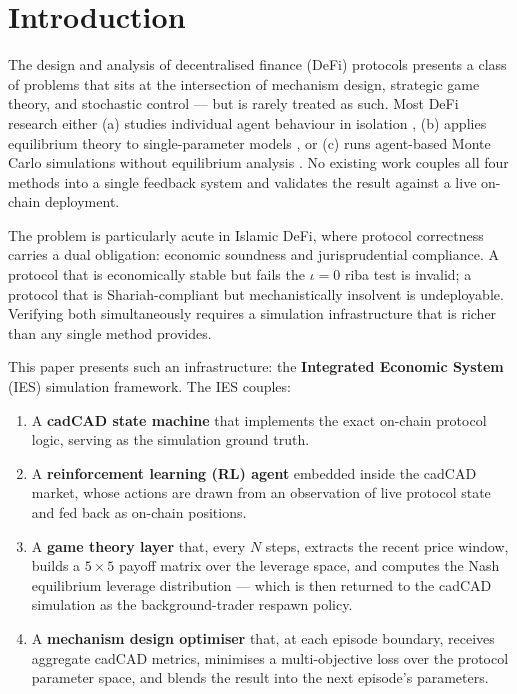 \documentclass[10pt,twocolumn]{article}
\theoremstyle{plain}
\theoremstyle{definition}
\begin{document}
\section*{}
\vspace{-1.5em}

\section{Introduction}
\label{sec:intro}

The design and analysis of decentralised finance (DeFi)
protocols presents a class of problems that sits at the
intersection of mechanism design, strategic game theory, and
stochastic control --- but is rarely treated as such.  Most
DeFi research either (a) studies individual agent behaviour
in isolation \cite{Daian2020,Qin2021}, (b) applies equilibrium
theory to single-parameter models \cite{Lehar2021}, or
(c) runs agent-based Monte Carlo simulations without
equilibrium analysis \cite{Angeris2020}.  No existing work
couples all four methods into a single feedback system and
validates the result against a live on-chain deployment.

The problem is particularly acute in Islamic DeFi, where
protocol correctness carries a dual obligation: economic
soundness and jurisprudential compliance.  A protocol that
is economically stable but fails the $\iota=0$ riba test is
invalid; a protocol that is Shariah-compliant but
mechanistically insolvent is undeployable.  Verifying both
simultaneously requires a simulation infrastructure that is
richer than any single method provides.

This paper presents such an infrastructure: the \textbf{Integrated
Economic System} (IES) simulation framework.  The IES
couples:

\begin{enumerate}[leftmargin=*,noitemsep]
\item A \textbf{cadCAD state machine} that implements the
  exact on-chain protocol logic, serving as the simulation
  ground truth.
\item A \textbf{reinforcement learning (RL) agent} embedded
  inside the cadCAD market, whose actions are drawn from
  an observation of live protocol state and fed back as
  on-chain positions.
\item A \textbf{game theory layer} that, every $N$ steps,
  extracts the recent price window, builds a
  $5\times5$ payoff matrix over the leverage space, and
  computes the Nash equilibrium leverage distribution ---
  which is then returned to the cadCAD simulation as the
  background-trader respawn policy.
\item A \textbf{mechanism design optimiser} that, at each
  episode boundary, receives aggregate cadCAD metrics,
  minimises a multi-objective loss over the protocol
  parameter space, and blends the result into the
  next episode's parameters.
\end{enumerate}
\end{document}
